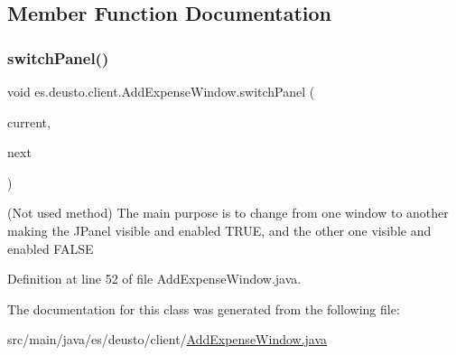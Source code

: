 \subsection{Member Function Documentation}
\mbox{\label{classes_1_1deusto_1_1client_1_1_add_expense_window_a6240f4fbc81e74662e2b811e20768e9a}} 
\subsubsection{\texorpdfstring{switch\+Panel()}{switchPanel()}}
{\footnotesize\ttfamily void es.\+deusto.\+client.\+Add\+Expense\+Window.\+switch\+Panel (\begin{DoxyParamCaption}\item[{J\+Panel}]{current,  }\item[{J\+Panel}]{next }\end{DoxyParamCaption})}

(Not used method) The main purpose is to change from one window to another making the J\+Panel visible and enabled T\+R\+UE, and the other one visible and enabled F\+A\+L\+SE 

Definition at line 52 of file Add\+Expense\+Window.\+java.



The documentation for this class was generated from the following file\+:\begin{DoxyCompactItemize}
\item 
src/main/java/es/deusto/client/\hyperlink{_add_expense_window_8java}{Add\+Expense\+Window.\+java}\end{DoxyCompactItemize}
